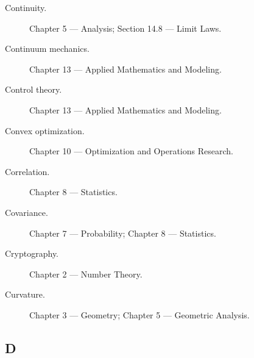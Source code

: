 \begin{description}
\item[Continuity.]
Chapter 5 --- Analysis;
Section 14.8 --- Limit Laws.

\item[Continuum mechanics.]
Chapter 13 --- Applied Mathematics and Modeling.

\item[Control theory.]
Chapter 13 --- Applied Mathematics and Modeling.

\item[Convex optimization.]
Chapter 10 --- Optimization and Operations Research.

\item[Correlation.]
Chapter 8 --- Statistics.

\item[Covariance.]
Chapter 7 --- Probability;
Chapter 8 --- Statistics.

\item[Cryptography.]
Chapter 2 --- Number Theory.

\item[Curvature.]
Chapter 3 --- Geometry;
Chapter 5 --- Geometric Analysis.

\end{description}

\subsection*{D}

